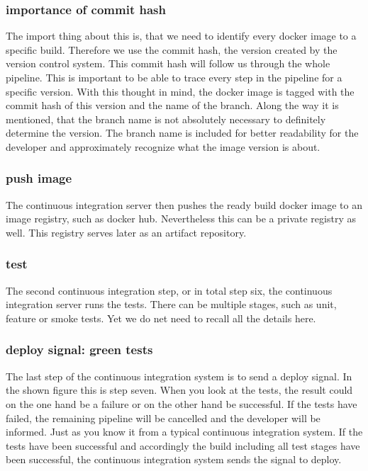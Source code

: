 \subsubsection{importance of commit hash}
The import thing about this is, that we need to identify every docker image to a specific
build. Therefore we use the commit hash, the version created by the version control
system. This commit hash will follow us through the whole pipeline. This is important to
be able to trace every step in the pipeline for a specific version. With this thought in
mind, the docker image is tagged with the commit hash of this version and the name of the
branch. Along the way it is mentioned, that the branch name is not absolutely necessary to
definitely determine the version. The branch name is included for better readability for
the developer and approximately recognize what the image version is about.

\subsubsection{push image}
The continuous integration server then pushes the ready build docker image to an image
registry, such as docker hub. Nevertheless this can be a private registry as well. This
registry serves later as an artifact repository.

\subsubsection{test}
The second continuous integration step, or in total step six, the continuous integration
server runs the tests. There can be multiple stages, such as unit, feature or smoke
tests. Yet we do net need to recall all the details here.

\subsubsection{deploy signal: green tests}
The last step of the continuous integration system is to send a deploy signal. In the
shown figure this is step seven. When you look at the tests, the result could on the one
hand be a failure or on the other hand be successful. If the tests have failed, the
remaining pipeline will be cancelled and the developer will be informed. Just as you know
it from a typical continuous integration system. If the tests have been successful and
accordingly the build including all test stages have been successful, the continuous
integration system sends the signal to deploy.

